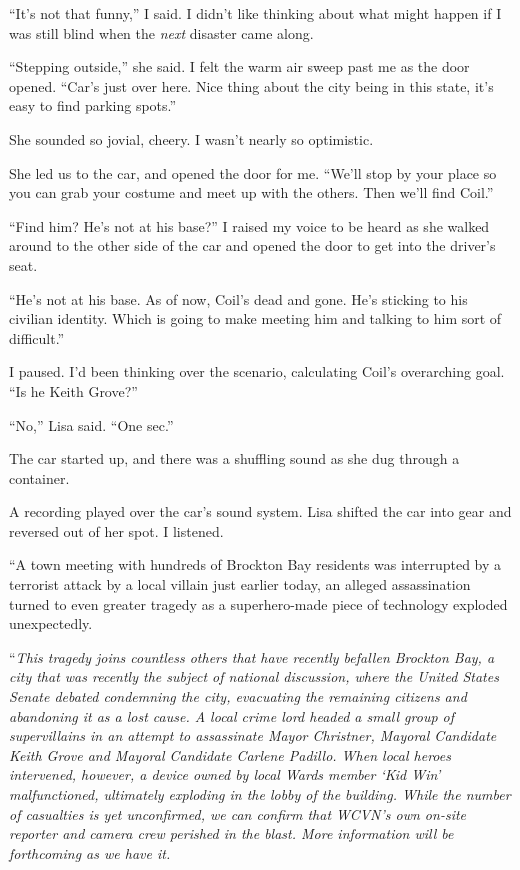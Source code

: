 ``It's not that funny,'' I said.  I didn't like thinking about what might happen if I was still blind when the \emph{next} disaster came along.



``Stepping outside,'' she said.  I felt the warm air sweep past me as the door opened.  ``Car's just over here.  Nice thing about the city being in this state, it's easy to find parking spots.''



She sounded so jovial, cheery.  I wasn't nearly so optimistic.



She led us to the car, and opened the door for me.  ``We'll stop by your place so you can grab your costume and meet up with the others.  Then we'll find Coil.''



``Find him?  He's not at his base?''  I raised my voice to be heard as she walked around to the other side of the car and opened the door to get into the driver's seat.



``He's not at his base.  As of now, Coil's dead and gone.  He's sticking to his civilian identity.  Which is going to make meeting him and talking to him sort of difficult.''



I paused.  I'd been thinking over the scenario, calculating Coil's overarching goal.  ``Is he Keith Grove?''



``No,'' Lisa said.  ``One sec.''



The car started up, and there was a shuffling sound as she dug through a container.



A recording played over the car's sound system.  Lisa shifted the car into gear and reversed out of her spot.  I listened.



``A town meeting with hundreds of Brockton Bay residents was interrupted by a terrorist attack by a local villain just earlier today, an alleged assassination turned to even greater tragedy as a superhero-made piece of technology exploded unexpectedly.



``\emph{This tragedy joins countless others that have recently befallen Brockton Bay, a city that was recently the subject of national discussion, where the United States Senate debated condemning the city, evacuating the remaining citizens and abandoning it as a lost cause.  A local crime lord headed a small group of supervillains in an attempt to assassinate Mayor Christner, Mayoral Candidate Keith Grove and Mayoral Candidate Carlene Padillo.  When local heroes intervened, however, a device owned by local Wards member `Kid Win' malfunctioned, ultimately exploding in the lobby of the building.  While the number of casualties is yet unconfirmed, we can confirm that WCVN's own on-site reporter and camera crew perished in the blast.  More information will be forthcoming as we have it.}




